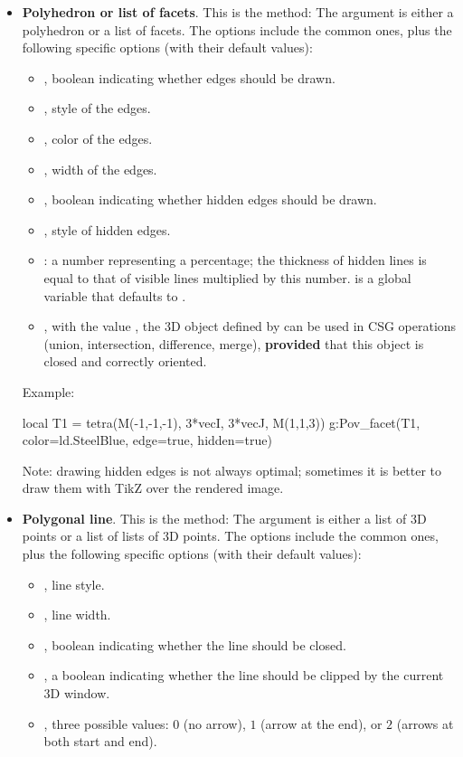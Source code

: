 \begin{itemize}
    \item \textbf{Polyhedron or list of facets}. This is the method:
    The argument  is either a polyhedron or a list of facets. The options include the common ones, plus the following specific options (with their default values): 
    \begin{itemize}
        \item {}, boolean indicating whether edges should be drawn.
        \item {}, style of the edges.
        \item {}, color of the edges.
        \item {}, width of the edges.
        \item {}, boolean indicating whether hidden edges should be drawn.
        \item {}, style of hidden edges.
        \item {}: a number representing a percentage; the thickness of hidden lines is equal to that of visible lines multiplied by this number.  is a global variable that defaults to .
        \item {}, with the value \true, the 3D object defined by  can be used in CSG operations (union, intersection, difference, merge), \textbf{provided} that this object is closed and correctly oriented.
    \end{itemize}
    Example:
    \begin{Luacode}
    local T1 = tetra(M(-1,-1,-1), 3*vecI, 3*vecJ, M(1,1,3))
    g:Pov_facet(T1, {color=ld.SteelBlue, edge=true, hidden=true})
    \end{Luacode}
    Note: drawing hidden edges is not always optimal; sometimes it is better to draw them with TikZ over the rendered image.
    
    
    \item \textbf{Polygonal line}. This is the method:
    The argument  is either a list of 3D points or a list of lists of 3D points. The options include the common ones, plus the following specific options (with their default values): 
    \begin{itemize}
        \item {}, line style.
        \item {}, line width.
        \item {}, boolean indicating whether the line should be closed.
        \item {}, a boolean indicating whether the line should be clipped by the current 3D window.
        \item {}, three possible values: $0$ (no arrow), $1$ (arrow at the end), or $2$ (arrows at both start and end).
        

\end{itemize}
\end{itemize}
